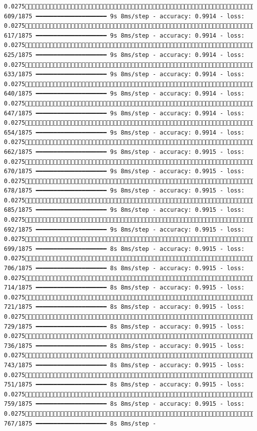 \documentclass[
  letterpaper,
  DIV=11,
  numbers=noendperiod]{scrreprt}
\begin{document}
\begin{verbatim}
0.0275 609/1875 ━━━━━━━━━━━━━━━━━━━━ 9s 8ms/step - accuracy: 0.9914 - loss: 0.0275 617/1875 ━━━━━━━━━━━━━━━━━━━━ 9s 8ms/step - accuracy: 0.9914 - loss: 0.0275 625/1875 ━━━━━━━━━━━━━━━━━━━━ 9s 8ms/step - accuracy: 0.9914 - loss: 0.0275 633/1875 ━━━━━━━━━━━━━━━━━━━━ 9s 8ms/step - accuracy: 0.9914 - loss: 0.0275 640/1875 ━━━━━━━━━━━━━━━━━━━━ 9s 8ms/step - accuracy: 0.9914 - loss: 0.0275 647/1875 ━━━━━━━━━━━━━━━━━━━━ 9s 8ms/step - accuracy: 0.9914 - loss: 0.0275 654/1875 ━━━━━━━━━━━━━━━━━━━━ 9s 8ms/step - accuracy: 0.9914 - loss: 0.0275 662/1875 ━━━━━━━━━━━━━━━━━━━━ 9s 8ms/step - accuracy: 0.9915 - loss: 0.0275 670/1875 ━━━━━━━━━━━━━━━━━━━━ 9s 8ms/step - accuracy: 0.9915 - loss: 0.0275 678/1875 ━━━━━━━━━━━━━━━━━━━━ 9s 8ms/step - accuracy: 0.9915 - loss: 0.0275 685/1875 ━━━━━━━━━━━━━━━━━━━━ 9s 8ms/step - accuracy: 0.9915 - loss: 0.0275 692/1875 ━━━━━━━━━━━━━━━━━━━━ 9s 8ms/step - accuracy: 0.9915 - loss: 0.0275 699/1875 ━━━━━━━━━━━━━━━━━━━━ 8s 8ms/step - accuracy: 0.9915 - loss: 0.0275 706/1875 ━━━━━━━━━━━━━━━━━━━━ 8s 8ms/step - accuracy: 0.9915 - loss: 0.0275 714/1875 ━━━━━━━━━━━━━━━━━━━━ 8s 8ms/step - accuracy: 0.9915 - loss: 0.0275 721/1875 ━━━━━━━━━━━━━━━━━━━━ 8s 8ms/step - accuracy: 0.9915 - loss: 0.0275 729/1875 ━━━━━━━━━━━━━━━━━━━━ 8s 8ms/step - accuracy: 0.9915 - loss: 0.0275 736/1875 ━━━━━━━━━━━━━━━━━━━━ 8s 8ms/step - accuracy: 0.9915 - loss: 0.0275 743/1875 ━━━━━━━━━━━━━━━━━━━━ 8s 8ms/step - accuracy: 0.9915 - loss: 0.0275 751/1875 ━━━━━━━━━━━━━━━━━━━━ 8s 8ms/step - accuracy: 0.9915 - loss: 0.0275 759/1875 ━━━━━━━━━━━━━━━━━━━━ 8s 8ms/step - accuracy: 0.9915 - loss: 0.0275 767/1875 ━━━━━━━━━━━━━━━━━━━━ 8s 8ms/step - 
\end{verbatim}
\end{document}
